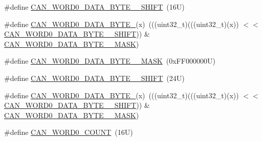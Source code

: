 \begin{DoxyCompactItemize}
\item 
\#define \mbox{\hyperlink{group___c_a_n___register___masks_ga93129c7dd5f1db1583bf5110179d7a4e}{C\+A\+N\+\_\+\+W\+O\+R\+D0\+\_\+\+D\+A\+T\+A\+\_\+\+B\+Y\+T\+E\+\_\+\_\+\+S\+H\+I\+FT}}~(16\+U)
\item 
\#define \mbox{\hyperlink{group___c_a_n___register___masks_gab354cb64d4a5a33952bba439d4fc36a6}{C\+A\+N\+\_\+\+W\+O\+R\+D0\+\_\+\+D\+A\+T\+A\+\_\+\+B\+Y\+T\+E\+\_}}(x)~(((uint32\+\_\+t)(((uint32\+\_\+t)(x)) $<$$<$ \mbox{\hyperlink{group___c_a_n___register___masks_ga93129c7dd5f1db1583bf5110179d7a4e}{C\+A\+N\+\_\+\+W\+O\+R\+D0\+\_\+\+D\+A\+T\+A\+\_\+\+B\+Y\+T\+E\+\_\+\_\+\+S\+H\+I\+FT}})) \& \mbox{\hyperlink{group___c_a_n___register___masks_ga9e7f294cbdc5772dc2de56ec615eb695}{C\+A\+N\+\_\+\+W\+O\+R\+D0\+\_\+\+D\+A\+T\+A\+\_\+\+B\+Y\+T\+E\+\_\+\_\+\+M\+A\+SK}})
\item 
\#define \mbox{\hyperlink{group___c_a_n___register___masks_ga850d4e3257b02cacead5d9e2b757818c}{C\+A\+N\+\_\+\+W\+O\+R\+D0\+\_\+\+D\+A\+T\+A\+\_\+\+B\+Y\+T\+E\+\_\+\_\+\+M\+A\+SK}}~(0x\+F\+F000000\+U)
\item 
\#define \mbox{\hyperlink{group___c_a_n___register___masks_gaf84582fa0ea01d047081e02025634145}{C\+A\+N\+\_\+\+W\+O\+R\+D0\+\_\+\+D\+A\+T\+A\+\_\+\+B\+Y\+T\+E\+\_\+\_\+\+S\+H\+I\+FT}}~(24\+U)
\item 
\#define \mbox{\hyperlink{group___c_a_n___register___masks_ga3deb5bd24c168fa54bd47f0ad12d7873}{C\+A\+N\+\_\+\+W\+O\+R\+D0\+\_\+\+D\+A\+T\+A\+\_\+\+B\+Y\+T\+E\+\_}}(x)~(((uint32\+\_\+t)(((uint32\+\_\+t)(x)) $<$$<$ \mbox{\hyperlink{group___c_a_n___register___masks_gaf84582fa0ea01d047081e02025634145}{C\+A\+N\+\_\+\+W\+O\+R\+D0\+\_\+\+D\+A\+T\+A\+\_\+\+B\+Y\+T\+E\+\_\+\_\+\+S\+H\+I\+FT}})) \& \mbox{\hyperlink{group___c_a_n___register___masks_ga850d4e3257b02cacead5d9e2b757818c}{C\+A\+N\+\_\+\+W\+O\+R\+D0\+\_\+\+D\+A\+T\+A\+\_\+\+B\+Y\+T\+E\+\_\+\_\+\+M\+A\+SK}})
\item 
\#define \mbox{\hyperlink{group___c_a_n___register___masks_gaf4d448d92331498226d98ea4fbf36bca}{C\+A\+N\+\_\+\+W\+O\+R\+D0\+\_\+\+C\+O\+U\+NT}}~(16\+U)
\end{DoxyCompactItemize}

